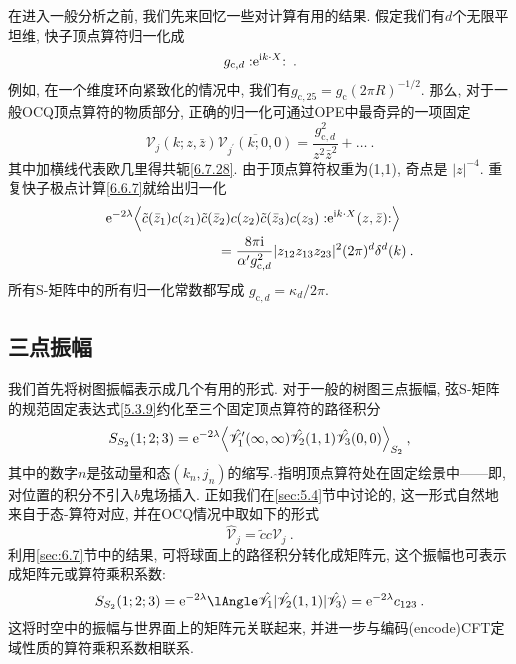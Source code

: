 在进入一般分析之前, 我们先来回忆一些对计算有用的结果. 假定我们有$d$个无限平坦维, 快子顶点算符归一化成
\begin{equation}
	g_{\mathrm{c}, d} :\mathrel{\mathrm{e}^{\mathrm{i} k \cdot X}}: \:. \label{9.1.1}
\end{equation}
例如, 在一个维度环向紧致化的情况中, 我们有$g_{\mathrm{c}, 25}=g_{\mathrm{c}}(2 \pi R)^{-1 / 2}$. 
那么, 对于一般OCQ顶点算符的物质部分, 正确的归一化可通过OPE中最奇异的一项固定
\begin{equation}
	\mathscr{V}_{j}(k; z, \bar{z}) \overline{\mathscr{V}_{j^{\prime}}(k; 0,0)} = 
	\frac{g_{\mathrm{c}, d}^{2}}{z^{2} \bar{z}^{2}}+\ldots \:. \label{9.1.2}
\end{equation}
其中加横线代表欧几里得共轭\eqref{6.7.28}. 由于顶点算符权重为(1,1), 奇点是 $|z|^{-4}$. 重复快子极点计算\eqref{6.6.7}就给出归一化
\begin{align}
	& \mathrm{e}^{-2 \lambda} \Bigl\langle \tilde{c}(\bar{z}_{1}) c(z_{1}) \tilde{c}(\bar{z}_{2}) c(z_{2}) \tilde{c}(\bar{z}_{3}) 
	    c(z_{3}) : \mathrel{\mathrm{e}^{\mathrm{i} k \cdot X}(z, \bar{z})}:\Bigr\rangle \nonumber \\
	&\qquad \qquad \qquad \qquad =\frac{8 \pi \mathrm{i}}{\alpha^{\prime} g_{\mathrm{c}, d}^{2}} 
	    |z_{12} z_{13} z_{23}|^{2} (2 \pi)^{d} \delta^{d}(k) \:. \label{9.1.3}
\end{align}
所有S-矩阵中的所有归一化常数都写成 $g_{\mathrm{c}, d}=\kappa_{d} / 2 \pi$.

\subsection*{三点振幅}

我们首先将树图振幅表示成几个有用的形式. 对于一般的树图三点振幅, 弦S-矩阵的规范固定表达式\eqref{5.3.9}约化至三个固定顶点算符的路径积分
\begin{equation}
	S_{S_{2}}(1; 2; 3) = \mathrm{e}^{-2 \lambda} \Bigl\langle \hat{\mathscr{V}}_{1}^{\prime}(\infty, \infty) 
	                     \hat{\mathscr{V}}_{2}(1,1) \hat{\mathscr{V}}_{3}(0,0) \Bigr\rangle_{S_{2}} \:, \label{9.1.4}
\end{equation}
其中的数字$n$是弦动量和态$(k_n, j_n)$的缩写. $\hat{}$指明顶点算符处在固定绘景中——即, 对位置的积分不引入$b$鬼场插入. 
正如我们在\ref{sec:5.4}节中讨论的, 这一形式自然地来自于态-算符对应, 并在OCQ情况中取如下的形式
\begin{equation}
	\hat{\mathscr{V}}_{j} = \tilde{c} c \mathscr{V}_{j} \:. \label{9.1.5}
\end{equation}
利用\ref{sec:6.7}节中的结果, 可将球面上的路径积分转化成矩阵元, 这个振幅也可表示成矩阵元或算符乘积系数:
\begin{equation}
	S_{S_{2}}(1; 2; 3) = \me^{-2 \lambda}\lAngle\hat{\mathscr{V}}_{1}|\hat{\mathscr{V}}_{2}(1,1)|\hat{\mathscr{V}}_{3}\rangle
					   = \me^{-2 \lambda} c_{123} \:. \label{9.1.6}
\end{equation}
这将时空中的振幅与世界面上的矩阵元关联起来, 并进一步与编码(encode)CFT定域性质的算符乘积系数相联系. 

